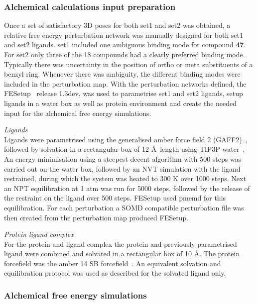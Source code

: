 \documentclass{svjour3}                     %
\begin{document}
\subsubsection{Alchemical calculations input preparation}

Once a set of satisfactory 3D poses for both set1 and set2 was obtained, a relative free energy perturbation network was manually designed for both set1 and set2 ligands. set1 included one ambiguous binding mode for compound \textbf{47}. For set2 only three of the 18 compounds had a clearly preferred binding mode. Typically there was uncertainty in the position of ortho or meta substituents of a benzyl ring. Whenever there was ambiguity, the different binding modes were included in the perturbation map.
 With the perturbation networks defined, the FESetup~\cite{LoefflerMichelWoods2015} release 1.3dev,  was used to parametrise set1 and set2 ligands, setup ligands in a water box as well as protein environment and create the needed input for the alchemical free energy simulations. 

\noindent\emph{Ligands}\\
Ligands were parametrised using the generalised amber force field 2 (GAFF2)~\cite{AMBER}, followed by solvation in a rectangular box of 12 \AA~length using TIP3P water~\cite{JorgensenChandrasekharMaduraEtAl1983,NeriaFischerKarplus1996}. An energy minimisation using a steepest decent algorithm with 500 steps was carried out on the water box, followed by an NVT simulation with the ligand restrained, during which the system was heated to 300 K over 1000 steps. Next an NPT equilibration at 1 atm was run for 5000 steps, followed by the release of the restraint on the ligand over 500 steps. FESetup used  pmemd for this equilibration.  For each perturbation a SOMD compatible perturbation file was then created from the perturbation map produced FESetup. 

\noindent\emph{Protein ligand complex }\\
For the protein and ligand complex the protein and previously parametrised ligand were combined and solvated in a rectangular box of 10 \AA. The protein forcefield was the amber 14 SB forcefield~\cite{AMBER}. An equivalent solvation and equilibration protocol was used as described for the solvated ligand only.  

\subsubsection{Alchemical free energy simulations}
\end{document}
